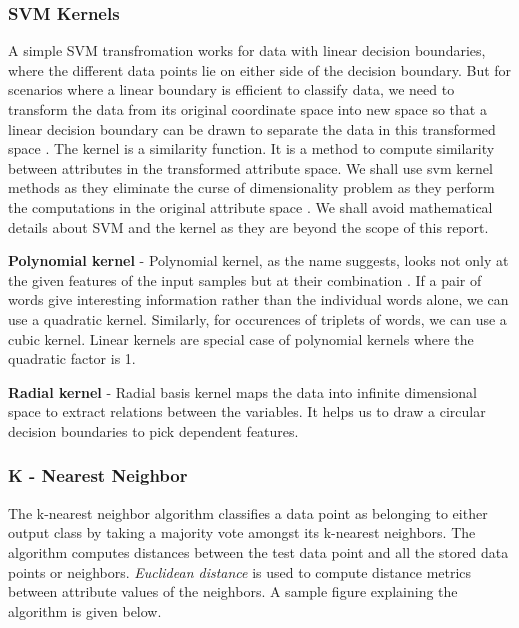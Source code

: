 \documentclass[9pt,twocolumn,twoside]{../../styles/osajnl}
\begin{document}
{\subsubsection{SVM Kernels}
A simple SVM transfromation works for data with linear decision
boundaries, where the different data points lie on either side of the
decision boundary. But for scenarios where a linear boundary is
efficient to classify data, we need to transform the data from its
original coordinate space into new space so that a linear decision
boundary can be drawn to separate the data in this transformed space
\cite{book-dataminingintroduction}. The kernel is a similarity
function. It is a method to compute similarity between attributes in
the transformed attribute space. We shall use svm kernel methods as
they eliminate the curse of dimensionality problem as they perform the
computations in the original attribute space
\cite{book-dataminingintroduction}. We shall avoid mathematical
details about SVM and the kernel as they are beyond the scope of this
report.\newline

\noindent
\textbf{Polynomial kernel} - Polynomial kernel, as the name suggests, looks not
only at the given features of the input samples but at their
combination \cite{www-polykernel-wiki}. If a pair of words give
interesting information rather than the individual words alone, we can
use a quadratic kernel. Similarly, for occurences of triplets of
words, we can use a cubic kernel. Linear kernels are special case of
polynomial kernels where the quadratic factor is 1.\newline

\noindent
\textbf{Radial kernel} - Radial basis kernel maps the data into infinite
dimensional space to extract relations between the variables. It helps
us to draw a circular decision boundaries to pick dependent features.

\subsubsection{K - Nearest Neighbor}
The k-nearest neighbor algorithm classifies a data point as belonging
to either output class by taking a majority vote amongst its k-nearest
neighbors. The algorithm computes distances between the test data
point and all the stored data points or neighbors. \emph{Euclidean
  distance} \cite{www-wiki-euclidean_distance} is used to compute
distance metrics between attribute values of the neighbors. A sample
figure explaining the algorithm is given below.

}
\end{document}
